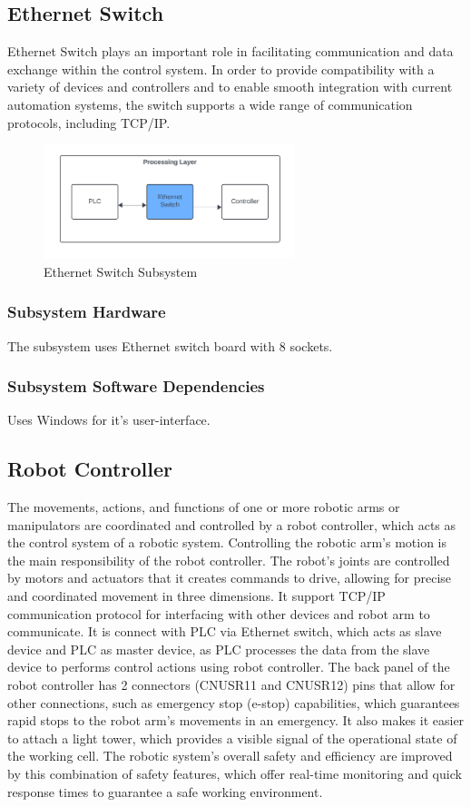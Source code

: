 \subsection{Ethernet Switch}
Ethernet Switch plays an important role in facilitating communication and data exchange within the control system. In order to provide compatibility with a variety of devices and controllers and to enable smooth integration with current automation systems, the switch supports a wide range of communication protocols, including TCP/IP. 
\begin{figure}[h!]
	\centering
 	\includegraphics[width=0.65\textwidth]{images/Ethernet_Processing.png}
 \caption{Ethernet Switch Subsystem}
\end{figure}

\subsubsection{Subsystem Hardware}
The subsystem uses Ethernet switch board with 8 sockets.

\subsubsection{Subsystem Software Dependencies}
Uses Windows for it's user-interface.


\subsection{Robot Controller}
The movements, actions, and functions of one or more robotic arms or manipulators are coordinated and controlled by a robot controller, which acts as the control system of a robotic system. Controlling the robotic arm's motion is the main responsibility of the robot controller. The robot's joints are controlled by motors and actuators that it creates commands to drive, allowing for precise and coordinated movement in three dimensions. It support TCP/IP communication protocol for interfacing with other devices and robot arm to communicate. It is connect with PLC via Ethernet switch, which acts as slave device and PLC as master device, as PLC processes the data from the slave device to performs control actions using robot controller.  
The back panel of the robot controller has 2 connectors (CNUSR11 and CNUSR12) pins that allow for other connections, such as emergency stop (e-stop) capabilities, which guarantees rapid stops to the robot arm's movements in an emergency. It also makes it easier to attach a light tower, which provides a visible signal of the operational state of the working cell. The robotic system's overall safety and efficiency are improved by this combination of safety features, which offer real-time monitoring and quick response times to guarantee a safe working environment.

